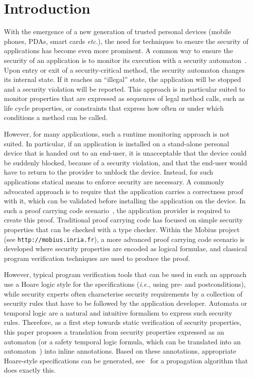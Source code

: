 \section{Introduction}\label{SecIntro}

With the emergence of a new generation of trusted personal devices
(mobile phones, PDAs, smart cards \emph{etc.}), the need for
techniques to ensure the security of applications has become even more
prominent. A common way to ensure the security of an application is to
monitor its execution with a security automaton~\cite{Schneider99}.
Upon entry or exit of a security-critical method, the security
automaton changes its internal state. If it reaches an ``illegal''
state, the application will be stopped and a security violation will
be reported. This approach is in particular suited to monitor
properties that are expressed as sequences of legal method calls, such as
life cycle properties, or constraints that express how often or under
which conditions a method can be called.

However, for many applications, such a runtime monitoring approach is
not suited. In particular, if an application is installed on a
stand-alone personal device that is handed out to an end-user, it is
unacceptable that the device could be suddenly blocked, because of a
security violation, and that the end-user would have to return to the
provider to unblock the device.  Instead, for such applications
statical means to enforce security are necessary. A commonly advocated
approach is to require that the application carries a correctness
proof with it, which can be validated before installing the application
on the device. In such a proof carrying code scenario~\cite{Necula97},
the application provider is required to create this proof. Traditional
proof carrying code has focused on simple security properties that can
be checked with a type checker. Within the
\textsf{Mobius} project (see \texttt{http://mobius.inria.fr}),
a more advanced proof carrying code scenario is developed where
security properties are encoded as logical formulae, and classical
program verification techniques are used to produce the proof.

However, typical program verification tools that can be used in such
an approach use a Hoare logic style for the specifications
(\emph{i.e.}, using pre- and postconditions), while security experts
often characterise security requirements by a collection of security
rules that have to be followed by the application developer. Automata
or temporal logic are a natural and intuitive formalism to express
such security rules. Therefore, as a first step towards static
verification of security properties, this paper proposes a translation
from security properties expressed as an automaton (or a safety
temporal logic formula, which can be translated into an
automaton~\cite{Wolper01}) into inline annotations. Based on these
annotations, appropriate Hoare-style specifications can be generated,
see~\cite{PavlovaBBHL04} for a propagation algorithm that does exactly
this.

